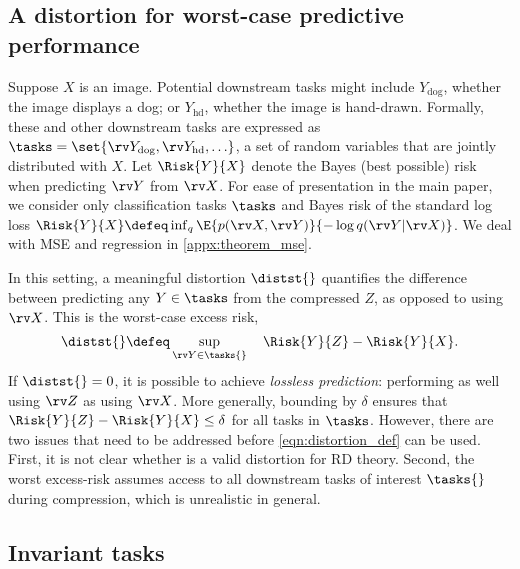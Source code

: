 \documentclass[final]{article}
\begin{document}
\subsection{A distortion for worst-case predictive performance}


Suppose $X$ is an image. Potential downstream tasks might include $Y_{\text{dog}}$, whether the image displays a dog; or $Y_{\text{hd}}$, whether the image is hand-drawn. Formally, these and other downstream tasks are expressed as $\tasks = \set{\rv Y_{\text{dog}}, \rv Y_{\text{hd}}, \ldots}$, a set of random variables that are jointly distributed with $X$. 
Let $\Risk{Y}{X}$ denote the Bayes (best possible) risk when predicting $\rv Y$ from $\rv X$.
For ease of presentation in the main paper, we consider only classification tasks $\tasks$ and Bayes risk of the standard log loss $\Risk{Y}{X} \defeq \inf_q \E{ p(\rv X, \rv Y) }{-\log q(\rv Y | \rv X)}$.
We deal with MSE and regression in \cref{appx:theorem_mse}.

In this setting, a meaningful distortion $\distst{}$ quantifies the difference between predicting any $Y \in \tasks$ from the compressed $Z$, as opposed to using $\rv X$. This is the worst-case excess risk,
\begin{equation}\label{eqn:distortion_def}
\distst{} \defeq  \sup_{\rv Y \in \tasks{}} \quad  \Risk{Y}{Z} - \Risk{Y}{X}.
\end{equation}
If $\distst{}=0$, it is possible to achieve \textit{lossless prediction}: performing as well using $\rv Z$ as using $\rv X$.
More generally, bounding \disttext{} by $\delta$ ensures that $\Risk{Y}{Z} - \Risk{Y}{X} \leq \delta$ for all tasks in $\tasks$. 
However, there are two issues that need to be addressed before \cref{eqn:distortion_def} can be used. 
First, it is not clear whether \disttext{} is a valid distortion for RD theory.
Second, the worst excess-risk \disttext{} assumes access to all downstream tasks of interest $\tasks{}$ during compression, which is unrealistic in general. 


\subsection{Invariant tasks}
\end{document}
